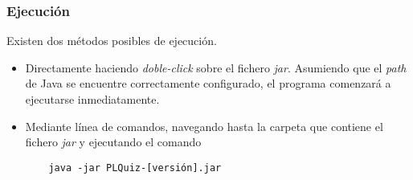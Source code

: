 \subsubsection{Ejecución}
Existen dos métodos posibles de ejecución.
\begin{itemize}
	\item Directamente haciendo \emph{doble-click} sobre el fichero \emph{jar}.
	Asumiendo que el \emph{path} de Java se encuentre correctamente configurado, el programa comenzará a ejecutarse inmediatamente.
	\item Mediante línea de comandos, navegando hasta la carpeta que contiene el fichero \emph{jar} y ejecutando el comando
	\begin{verbatim}
	java -jar PLQuiz-[versión].jar
	\end{verbatim}
\end{itemize}

